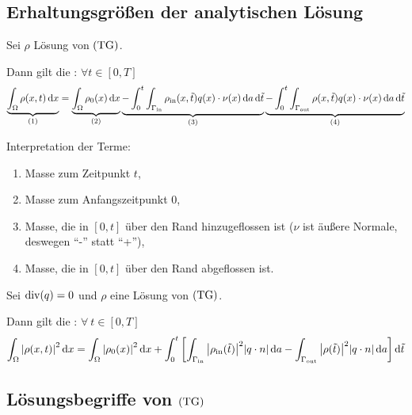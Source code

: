 \subsection{Erhaltungsgrößen der analytischen Lösung}
\label{subsec:Erhaltungsgroessen der analytischen Loesung}
\begin{Lemma}[Massenbilanz]
	\label{Massenbilanz}
	
	Sei $ \rho $ Lösung von $ \operatorname{(TG)} $. 
	
	Dann gilt die : $ \forall t \in [0,T] $
	\[ \underbrace{\int_{\Omega} \rho(x,t) \mathop{}\!\mathrm{d} x}_{(1)} = \underbrace{\int_{\Omega} \rho_0(x) \mathop{}\!\mathrm{d} x}_{(2)}  \underbrace{-\int_{0}^{t} \int_{\Gamma_{{\text{in}}}} \rho_{\text{in}}(x,\tilde{t}) q(x) \cdot \nu(x) \mathop{}\!\mathrm{d} a \mathop{}\!\mathrm{d} \tilde{t}}_{(3)} \underbrace{- \int_{0}^{t} \int_{\Gamma_{{\text{out}}}} \rho(x,\tilde{t}) q(x) \cdot \nu(x) \mathop{}\!\mathrm{d} a \mathop{}\!\mathrm{d} \tilde{t}}_{(4)} \]
\end{Lemma}
	Interpretation der Terme:
	\begin{enumerate}[label=(\arabic*)]
		\item Masse zum Zeitpunkt $ t $,
		\item Masse zum Anfangszeitpunkt $ 0 $,
		\item Masse, die in $ [0,t] $ über den Rand hinzugeflossen ist ($ \nu $ ist äußere Normale, deswegen \enquote{-} statt \enquote{+}),
		\item Masse, die in $ [0,t] $ über den Rand abgeflossen ist.
	\end{enumerate}

\begin{Lemma}[Energiebilanz]
	\label{Energiegleichung}
	
	Sei $ \operatorname{div}(q) = 0 $ und $ \rho $ eine Lösung von $ \operatorname{(TG)} $. 
	
	Dann gilt die : $ \forall \ t\in [0,T] $
	\[\int_{\Omega} \abs{\rho(x,t)}^2 \mathop{}\!\mathrm{d} x = \int_{\Omega} \abs{\rho_0(x)}^2 \mathop{}\!\mathrm{d} x  + \int_{0}^{t} \left[ \int_{\Gamma_{{\text{in}}}}\abs{\rho_{\text{in}}(\tilde{t})}^2 \abs{q\cdot n} \mathop{}\!\mathrm{d} a - \int_{\Gamma_{{\text{out}}}} \abs{\rho(\tilde{t})}^2 \abs{q\cdot n} \mathop{}\!\mathrm{d} a  \right] \mathop{}\!\mathrm{d} \tilde{t} \] 
\end{Lemma}

\subsection{Lösungsbegriffe von $ \operatorname{(TG)} $}

